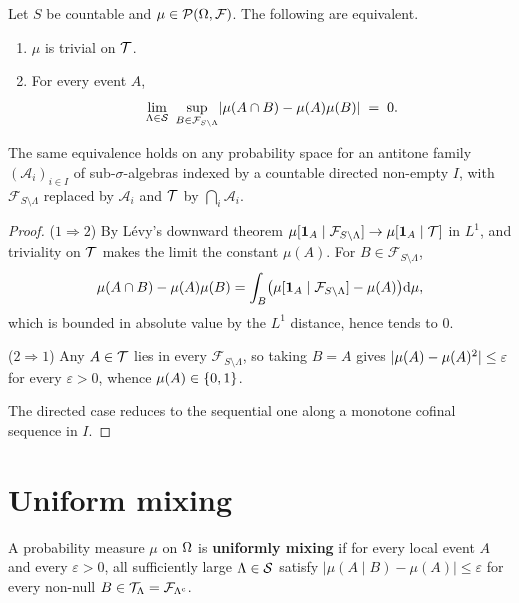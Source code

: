 \begin{theorem}[Georgii (7.9)]
    \label{thm:ext-79}
    \leanok

    Let $S$ be countable and $\mu \in \mathcal{P}(\Omega, \mathcal F)$. The following are equivalent.
    \begin{enumerate}
        \item $\mu$ is trivial on $\mathcal{T}$.
        \item For every event $A$,
          \[\lim_{\Lambda \in \mathcal{S}} \ \sup_{B \in \mathcal F_{S \setminus \Lambda}}
            \lvert \mu(A \cap B) - \mu(A)\mu(B)\rvert \;=\; 0 .\]
    \end{enumerate}
    The same equivalence holds on any probability space for an antitone family
    $(\mathcal A_i)_{i \in I}$ of sub-$\sigma$-algebras indexed by a countable directed non-empty
    $I$, with $\mathcal F_{S\setminus\Lambda}$ replaced by $\mathcal A_i$ and $\mathcal{T}$ by
    $\bigcap_{i} \mathcal A_i$.
\end{theorem}
\begin{proof}
    \leanok

    ($1 \Rightarrow 2$) By L\'evy's downward theorem $\mu[\mathbf{1}_A \mid \mathcal F_{S \setminus \Lambda}]
    \to \mu[\mathbf{1}_A \mid \mathcal{T}]$ in $L^1$, and triviality on $\mathcal{T}$ makes the limit the constant
    $\mu(A)$. For $B \in \mathcal F_{S\setminus\Lambda}$,
    \[\mu(A \cap B) - \mu(A)\mu(B)
      = \int_B \bigl(\mu[\mathbf{1}_A \mid \mathcal F_{S\setminus\Lambda}] - \mu(A)\bigr) \mathrm{d}\mu,\]
    which is bounded in absolute value by the $L^1$ distance, hence tends to $0$.

    ($2 \Rightarrow 1$) Any $A \in \mathcal{T}$ lies in every $\mathcal F_{S\setminus\Lambda}$, so taking
    $B = A$ gives $\lvert \mu(A) - \mu(A)^2\rvert \leq \varepsilon$ for every $\varepsilon > 0$, whence
    $\mu(A) \in \left\{ 0,1 \right\}$.

    The directed case reduces to the sequential one along a monotone cofinal sequence in $I$.
\end{proof}

\section{Uniform mixing}

\begin{definition}
    \label{def:ext-710}
    \leanok

    A probability measure $\mu$ on $\Omega$ is \textbf{uniformly mixing} if for every local event
    $A$ and every $\varepsilon > 0$, all sufficiently large $\Lambda \in \mathcal{S}$ satisfy
    $|\mu(A \mid B) - \mu(A)| \le \varepsilon$ for every non-null
    $B \in \mathcal{T}_\Lambda = \mathcal{F}_{\Lambda^{\mathrm{c}}}$.
\end{definition}

